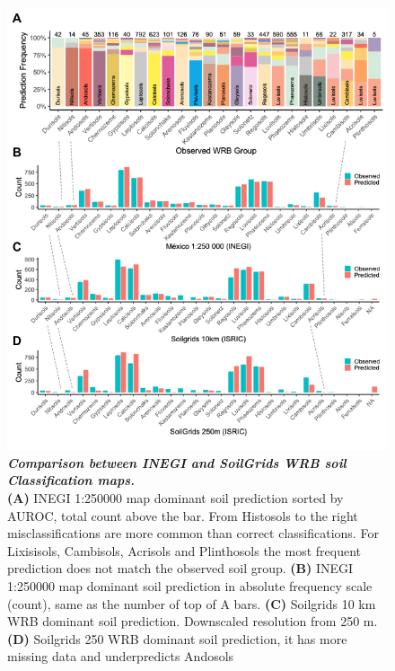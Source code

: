 \begin{figure}[!ht]
\centering
\includegraphics[width=\linewidth]{Chapter-2/figs/WRB_inegi_soilgrids.png}
\caption[Comparison between INEGI and SoilGrids WRB soil Classification Maps]{\textit{\textbf{Comparison between INEGI and SoilGrids WRB soil Classification maps.}} \\\hspace{\textwidth}
\textbf{(A)} INEGI 1:250000 map dominant soil prediction sorted by AUROC, total count above the bar. From Histosols to the right misclassifications are more common than correct classifications. For Lixisisols, Cambisols, Acrisols and Plinthosols the most frequent prediction does not match the observed soil group.
\textbf{(B)}  INEGI 1:250000 map dominant soil prediction in absolute frequency scale (count), same as the number of top of A bars.
\textbf{(C)} Soilgrids 10 km WRB dominant soil prediction. Downscaled resolution from 250 m.
\textbf{(D)} Soilgrids 250 WRB dominant soil prediction, it  has more missing data and underpredicts Andosols}
\label{fig::WRB_inegi_soilgrids}
\end{figure}
\clearpage


